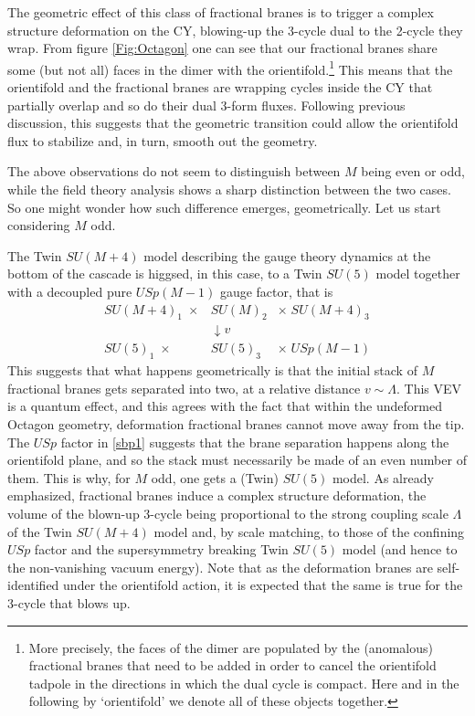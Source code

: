 \documentclass[a4paper,12pt]{article}
\begin{document}
{The geometric effect of this class of fractional branes is to trigger a complex structure deformation on the CY, blowing-up the 3-cycle dual to the 2-cycle they wrap. From figure \ref{Fig:Octagon} one can see that our fractional branes share some (but not all) faces in the dimer with the orientifold.\footnote{More precisely, the faces of the dimer are populated by the (anomalous) fractional branes that need to be added in order to cancel the orientifold tadpole in the directions in which the dual cycle is compact. Here and in the following by `orientifold' we denote all of these objects together.} This means that the orientifold and the fractional branes are wrapping cycles inside the CY that partially overlap and so do their dual 3-form fluxes. Following previous discussion, this suggests that the geometric transition could allow the orientifold flux to stabilize and, in turn, smooth out the geometry. 

The above observations do not seem to distinguish between $M$ being even or odd, while the field theory analysis shows a sharp distinction between the two cases.  So one might wonder how such difference emerges, geometrically. Let us start considering $M$ odd.

The Twin $SU(M+4)$ model describing the gauge theory dynamics at the bottom of the cascade is higgsed, in this case, to a Twin $SU(5)$ model together with a decoupled pure $USp(M-1)$ gauge factor, that is
\begin{eqnarray}
\label{sbp1}
	SU(M+4)_1\; \times &SU(M)_2& \times \;SU(M+4)_3 \nonumber \\ 
	&\downarrow v & \\ 
	 SU(5)_1\; \times &SU(5)_3& \times \; USp(M-1) \nonumber
\end{eqnarray}
This suggests that what happens geometrically is that the initial stack of $M$ fractional branes gets separated into two,  at a relative distance $v \sim \Lambda$. This VEV is a quantum effect, and this agrees with the fact that within the undeformed Octagon geometry, deformation fractional branes cannot move away from the tip. The $USp$ factor in \eqref{sbp1} suggests that the brane separation happens along the orientifold plane, and so the stack must necessarily be made of an even number of them. This is why, for $M$ odd, one gets a (Twin) $SU(5)$ model. As already emphasized, fractional branes induce a complex structure deformation, the volume of the blown-up 3-cycle being proportional to the strong coupling scale $\Lambda$ of the Twin $SU(M+4)$ model and, by scale matching, to those of the confining $USp$ factor and the supersymmetry breaking Twin $SU(5)$ model (and hence to the non-vanishing vacuum energy). Note that as the deformation branes are self-identified under the orientifold action, it is expected that the same is true for the 3-cycle that blows up. 

}
\end{document}
